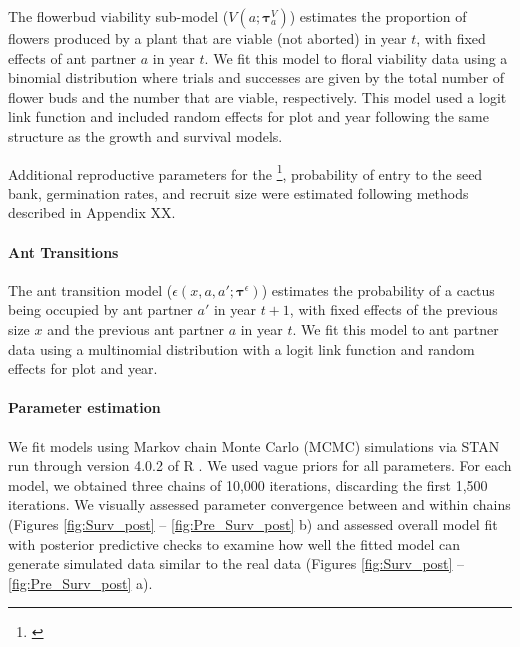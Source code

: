 \documentclass[11pt]{article}
\newcommand{\tom}[2]{{\color{red}{#1}}\footnote{\textit{\color{red}{#2}}}}
\begin{document}
The flowerbud viability sub-model ($V(a;\pmb{\tau}^{V}_{a})$) estimates the proportion of flowers produced by a plant that are viable (not aborted) in year $t$, with fixed effects of ant partner $a$ in year $t$.
We fit this model to floral viability data using a binomial distribution where trials and successes are given by the total number of flower buds and the number that are viable, respectively.
This model used a logit link function and included random effects for plot and year following the same structure as the growth and survival models. 

Additional reproductive parameters for the \tom{number of seeds per fruit}{We need to briefly explain that this was any-specific, where those values come from, and how we deal with Other.}, probability of entry to the seed bank, germination rates, and recruit size were estimated following methods described in Appendix XX.

\paragraph{Ant Transitions}
The ant transition model ($\epsilon(x,a,a';\pmb{\tau}^{\epsilon})$) estimates the probability of a cactus being occupied by ant partner $a'$ in year $t+1$, with fixed effects of the previous size $x$  and the previous ant partner $a$  in year $t$.
We fit this model to ant partner data using a multinomial distribution with a logit link function and random effects for plot and year. 

\paragraph{Parameter estimation}
We fit models using Markov chain Monte Carlo (MCMC) simulations via STAN run through version 4.0.2 of R \cite{Rcite,Rstancite}. 
We used vague priors for all parameters. 
For each model, we obtained three chains of 10,000 iterations, discarding the first 1,500 iterations. 
We visually assessed parameter convergence between and within chains (Figures \ref{fig:Surv_post} -- \ref{fig:Pre_Surv_post} b) and assessed overall model fit with posterior predictive checks to examine how well the fitted model can generate simulated data similar to the real data (Figures \ref{fig:Surv_post} -- \ref{fig:Pre_Surv_post} a).
\end{document}
